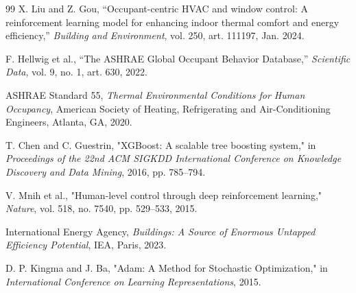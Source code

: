 \documentclass[12pt, a4paper]{report}
\begin{document}
\cleardoublepage
{}
\renewcommand{\bibname}{Tài liệu tham khảo}
\begin{thebibliography}{99}
X. Liu and Z. Gou, ``Occupant-centric HVAC and window control: A reinforcement learning model for enhancing indoor thermal comfort and energy efficiency,'' \textit{Building and Environment}, vol. 250, art. 111197, Jan. 2024.

F. Hellwig et al., ``The ASHRAE Global Occupant Behavior Database,'' \textit{Scientific Data}, vol. 9, no. 1, art. 630, 2022.

ASHRAE Standard 55, \textit{Thermal Environmental Conditions for Human Occupancy}, American Society of Heating, Refrigerating and Air-Conditioning Engineers, Atlanta, GA, 2020.

T. Chen and C. Guestrin, "XGBoost: A scalable tree boosting system," in \textit{Proceedings of the 22nd ACM SIGKDD International Conference on Knowledge Discovery and Data Mining}, 2016, pp. 785--794.

V. Mnih et al., "Human-level control through deep reinforcement learning," \textit{Nature}, vol. 518, no. 7540, pp. 529--533, 2015.

International Energy Agency, \textit{Buildings: A Source of Enormous Untapped Efficiency Potential}, IEA, Paris, 2023.





D. P. Kingma and J. Ba, "Adam: A Method for Stochastic Optimization," in \textit{International Conference on Learning Representations}, 2015.
\end{thebibliography}
\end{document}
